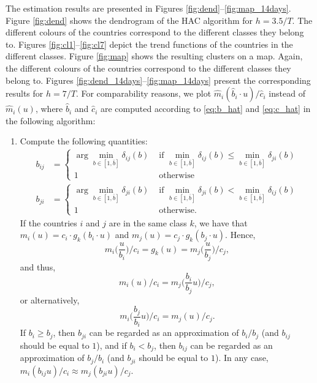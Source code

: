 \documentclass[a4paper,12pt]{article}
\numberwithin{equation}{section}
\begin{document}
The estimation results are presented in Figures \ref{fig:dend}--\ref{fig:map_14days}. Figure \ref{fig:dend} shows the dendrogram of the HAC algorithm for $h = 3.5/T$. The different colours of the countries correspond to the different classes they belong to. Figures \ref{fig:cl1}--\ref{fig:cl7} depict the trend functions of the countries in the different classes. Figure \ref{fig:map} shows the resulting clusters on a map. Again, the different colours of the countries correspond to the different classes they belong to. Figures \ref{fig:dend_14days}--\ref{fig:map_14days} present the corresponding results for $h=7/T$. For comparability reasons, we plot $\hat{m}_i(\hat{b}_i \cdot u) / \hat{c}_i$ instead of $\hat{m}_i(u)$, where $\hat{b}_i$ and $\hat{c}_i$ are computed according to \eqref{eq:b_hat} and \eqref{eq:c_hat} in the following algorithm:
\begin{enumerate}[label=\textit{Step \arabic*.},leftmargin=1.45cm]


\item Compute the following quantities:
\begin{align*}
b_{ij} &= \begin{cases}
\arg \min_{b \in [1, \bar{b}]} \delta_{ij}(b)  &\text{ if } \min_{b \in [1, \bar{b}]} \delta_{ij}(b) \leq \min_{b \in [1, \bar{b}]} \delta_{ji}(b) \\
1 &\text{ otherwise}
\end{cases}\\
b_{ji} &=\begin{cases}
\arg \min_{b \in [1, \bar{b}]} \delta_{ji}(b)  &\text{ if } \min_{b \in [1, \bar{b}]} \delta_{ji}(b) < \min_{b \in [1, \bar{b}]} \delta_{ij}(b) \\
1 &\text{ otherwise}.
\end{cases}
\end{align*}
If the countries $i$ and $j$ are in the same class $k$, we have that $m_i(u) = c_i \cdot g_k (b_i \cdot u)$ and $m_j(u) = c_j \cdot g_k( b_j \cdot u)$. Hence,
$$m_i \Big( \frac{u}{b_i} \Big) / c_i= g_k (u) = m_j \Big( \frac{u}{b_j} \Big) /c_j,$$
and thus,
$$m_i (u) / c_i = m_j \Big( \frac{b_i}{b_j} u \Big) /c_j,$$
or alternatively,
$$m_i\Big( \frac{b_j}{b_i} u \Big) /c_i = m_j (u) / c_j.$$
If $b_i \geq b_j$, then $b_{ji}$ can be regarded as an approximation of $b_i / b_j$ (and $b_{ij}$ should be equal to $1$), and if $b_i < b_j$, then $b_{ij}$ can be regarded as an approximation of $b_j/b_i$ (and $b_{ji}$ should be equal to $1$). In any case, $m_i( b_{ij} u ) /c_i \approx m_j (b_{ji} u) / c_j$.



\end{enumerate}
\end{document}
